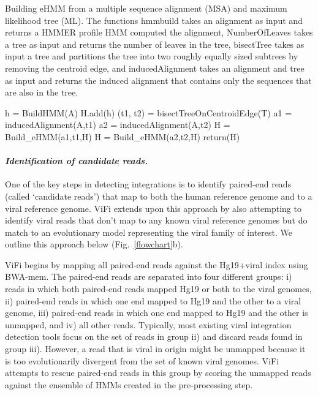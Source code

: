 \documentclass{bmcart}
\begin{document}
\begin{algorithm}
 \caption{\label{ehmms_algorithm}Building eHMM from a multiple sequence alignment (MSA) and maximum likelihood tree (ML).  The functions hmmbuild takes an alignment as input and returns a HMMER profile HMM computed the alignment, NumberOfLeaves takes a tree as input and returns the number of leaves in the tree, bisectTree takes as input a tree and partitions the tree into two roughly equally sized subtrees by removing the centroid edge, and inducedAlignment takes an alignment and tree as input and returns the induced alignment that contains only the sequences that are also in the tree.}
  \begin{algorithmic}[1]
      \State h = BuildHMM(A)
      \State H.add(h) 
        \State (t1, t2) = bisectTreeOnCentroidEdge(T) 
        \State a1 = inducedAlignment(A,t1) 
        \State a2 = inducedAlignment(A,t2)
        \State H = {\sc Build\_eHMM}(a1,t1,H)
        \State H = {\sc Build\_eHMM}(a2,t2,H)
      \Else
        \State return(H)
      \EndIf
     \EndFunction
\end{algorithmic}
\end{algorithm}

\paragraph{\emph{Identification of candidate reads.}}  
One of the key steps in detecting integrations is to identify paired-end
reads (called `candidate reads') that map to both the human reference genome and to a viral reference
genome.  ViFi extends upon this approach by also attempting to identify viral
reads that don't map to any known viral reference genomes but do match to an evolutionary model representing
the viral family of interest.  We outline this approach below (Fig.~\ref{flowchart}b).

ViFi begins by mapping all paired-end reads against the Hg19+viral index 
using BWA-mem.  The paired-end reads are separated into four
different groups: i) reads in which both paired-end reads mapped Hg19
or both to the viral genomes, ii) paired-end reads in which one end
mapped to Hg19 and the other to a viral genome, iii) paired-end reads
in which one end mapped to Hg19 and the other is unmapped, and iv) all
other reads.  Typically, most existing viral integration detection
tools focus on the set of reads in group ii) and discard reads
found in group iii).  However, a read that is viral in origin might be
unmapped because it is too evolutionarily divergent from the set of
known viral genomes.  ViFi attempts to rescue paired-end reads in this group 
by scoring the unmapped reads against the ensemble of HMMs created in the 
pre-processing step.   
\end{document}
